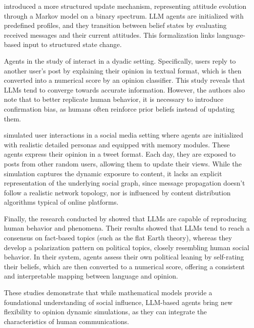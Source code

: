 \citet{gao2023s3socialnetworksimulationlarge} introduced a more structured update mechanism, representing attitude evolution through a Markov model on a binary spectrum. 
LLM agents are initialized with predefined profiles, and they transition between belief states by evaluating received messages and their current attitudes.
This formalization links language-based input to structured state change.

Agents in the study of \citet{chuang2024simulatingopiniondynamicsnetworks} interact in a dyadic setting. Specifically, users reply to another user's post by explaining their opinion in textual format, which is then converted into a numerical score by an opinion classifier.
This study reveals that LLMs tend to converge towards accurate information. However, the authors also note that to better replicate human behavior, it is necessary to introduce confirmation bias, as humans often reinforce prior beliefs instead of updating them.

\citet{Liu_2024} simulated user interactions in a social media setting where agents are initialized with realistic detailed personas and equipped with memory modules.
These agents express their opinion in a tweet format. 
Each day, they are exposed to posts from other random users, allowing them to update their views.
While the simulation captures the dynamic exposure to content, it lacks an explicit representation of the underlying social graph, since message propagation doesn't follow a realistic network topology, nor is influenced by content distribution algorithms typical of online platforms.

Finally, the research conducted by \citet{piao2025emergencehumanlikepolarizationlarge} showed that LLMs are capable of reproducing human behavior and phenomena. 
Their results showed that LLMs tend to reach a consensus on fact-based topics (such as the flat Earth theory), whereas they develop a polarization pattern on political topics, closely resembling human social behavior.
In their system, agents assess their own political leaning by self-rating their beliefs, which are then converted to a numerical score, offering a consistent and interpretable mapping between language and opinion.

\medskip
These studies demonstrate that while mathematical models provide a foundational understanding of social influence, LLM-based agents bring new flexibility to opinion dynamic simulations, as they can integrate the characteristics of human communications.


